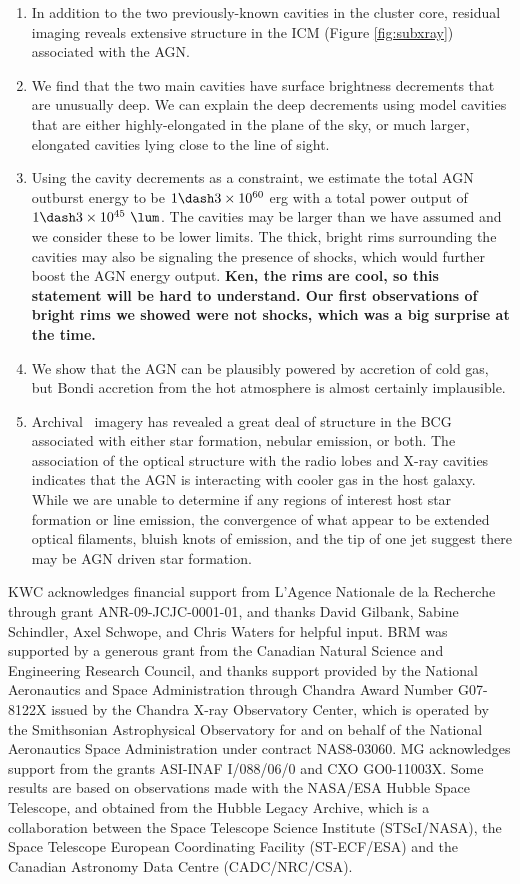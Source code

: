 \documentclass[11pt, preprint]{aastex}
\begin{document}
\begin{enumerate}
\item In addition to the two previously-known cavities in the cluster
  core, residual imaging reveals extensive structure in the ICM
  (Figure \ref{fig:subxray}) associated with the AGN.
\item We find that the two main cavities have surface brightness
  decrements that are unusually deep. We can explain the deep
  decrements using model cavities that are either highly-elongated in
  the plane of the sky, or much larger, elongated cavities lying close
  to the line of sight.
\item Using the cavity decrements as a constraint, we estimate the
  total AGN outburst energy to be $1 \dash 3 \times 10^{60}$ erg with
  a total power output of $1 \dash 3 \times 10^{45} ~\lum$. The
  cavities may be larger than we have assumed and we consider these to
  be lower limits. The thick, bright rims surrounding the cavities may
  also be signaling the presence of shocks, which would further boost
  the AGN energy output. {\bf Ken, the rims are cool, so this
    statement will be hard to understand. Our first observations of
    bright rims we showed were not shocks, which was a big surprise at
    the time.}
\item We show that the AGN can be plausibly powered by accretion of
  cold gas, but Bondi accretion from the hot atmosphere is almost
  certainly implausible.
\item Archival \hst\ imagery has revealed a great deal of structure in
  the BCG associated with either star formation, nebular emission, or
  both. The association of the optical structure with the radio lobes
  and X-ray cavities indicates that the AGN is interacting with cooler
  gas in the host galaxy. While we are unable to determine if any
  regions of interest host star formation or line emission, the
  convergence of what appear to be extended optical filaments, bluish
  knots of emission, and the tip of one jet suggest there may be AGN
  driven star formation.
\end{enumerate}

\acknowledgements

KWC acknowledges financial support from L'Agence Nationale de la
Recherche through grant ANR-09-JCJC-0001-01, and thanks David Gilbank,
Sabine Schindler, Axel Schwope, and Chris Waters for helpful
input. BRM was supported by a generous grant from the Canadian Natural
Science and Engineering Research Council, and thanks support provided
by the National Aeronautics and Space Administration through Chandra
Award Number G07-8122X issued by the Chandra X-ray Observatory Center,
which is operated by the Smithsonian Astrophysical Observatory for and
on behalf of the National Aeronautics Space Administration under
contract NAS8-03060. MG acknowledges support from the grants ASI-INAF
I/088/06/0 and CXO GO0-11003X. Some results are based on observations
made with the NASA/ESA Hubble Space Telescope, and obtained from the
Hubble Legacy Archive, which is a collaboration between the Space
Telescope Science Institute (STScI/NASA), the Space Telescope European
Coordinating Facility (ST-ECF/ESA) and the Canadian Astronomy Data
Centre (CADC/NRC/CSA).
\end{document}
